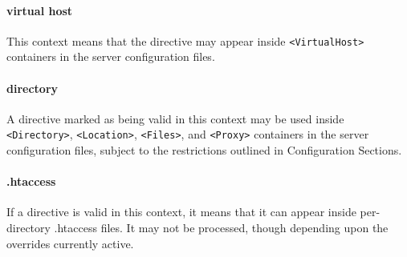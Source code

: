 \documentclass[a4paper, 11pt]{article}
\begin{document}
\paragraph{virtual host} This context means that the directive may appear inside \verb+<VirtualHost>+ containers in the server configuration files. 
\paragraph{directory} A directive marked as being valid in this context may be used inside \verb+<Directory>+, \verb+<Location>+, \verb+<Files>+, and \verb+<Proxy>+ containers in the server configuration files, subject to the restrictions outlined in Configuration Sections. 
\paragraph{.htaccess} If a directive is valid in this context, it means that it can appear inside per-directory .htaccess files. It may not be processed, though depending upon the overrides currently active. 
\end{document}
